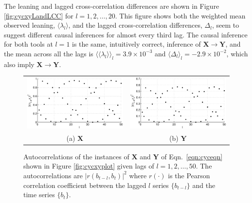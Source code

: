 The leaning and lagged cross-correlation differences are shown in Figure \ref{fig:cycxyLandLCC} for $l=1,2,\ldots,20$.  This figure shows both the weighted mean observed leaning, $\langle \lambda_l\rangle$, and the lagged cross-correlation differences, $\Delta_l$, seem to suggest different causal inferences for almost every third lag.  The causal inference for both tools at $l=1$ is the same, intuitively correct, inference of $\mathbf{X}\rightarrow\mathbf{Y}$, and the mean across all the lags is $\langle\langle\lambda_l\rangle\rangle_l=3.9\times 10^{-3}$ and $\langle\Delta_l\rangle_l=-2.9\times 10^{-2}$, which also imply $\mathbf{X}\rightarrow\mathbf{Y}$.  
\begin{figure}[ht]
\begin{tabular}{cc}
\includegraphics[scale=0.48]{NoisyCyclicResponseExample_autocorrX.eps} & \includegraphics[scale=0.48]{NoisyCyclicResponseExample_autocorrY.eps} \\
(a) $\mathbf{X}$ & (b) $\mathbf{Y}$
\end{tabular}
\caption{Autocorrelations of the instances of $\mathbf{X}$ and $\mathbf{Y}$ of Eqn.\ \ref{eqn:cyceqn} shown in Figure \ref{fig:cycxyplot} given lags of $l=1,2,\ldots,50$.  The autocorrelations are $|r(b_{t-l},b_t)|^2$ where $r(\cdot)$ is the Pearson correlation coefficient between the lagged $l$ series $\{b_{t-l}\}$ and the time series $\{b_{t}\}$.}
\label{fig:cycxyautocorr}
\end{figure}
